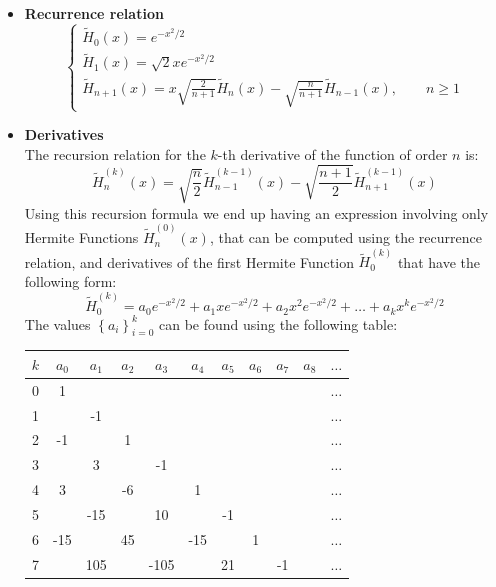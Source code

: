 \documentclass[a4paper,10pt]{article}
\begin{document}
\begin{itemize}
\item \textbf{Recurrence relation}
	\begin{equation}
		\begin{cases}
		\tilde{H}_0(x) = e^{-x^2/2}\\
		\tilde{H}_1(x) = \sqrt{2} x e^{-x^2/2}\\
		\tilde{H}_{n+1}(x) = x \sqrt{\frac{2}{n+1}} \tilde{H}_n(x) - \sqrt{\frac{n}{n+1}} \tilde{H}_{n-1}(x), \qquad n \geq 1
		\end{cases}
	\end{equation}
\item \textbf{Derivatives}\\
	The recursion relation for the $k$-th derivative of the function of order $n$ is:
	\begin{equation}
		\tilde{H}_n^{(k)}(x) = \sqrt{\frac{n}{2}}\tilde{H}_{n-1}^{(k-1)}(x) - \sqrt{\frac{n+1}{2}}\tilde{H}_{n+1}^{(k-1)}(x)
	\end{equation}
	Using this recursion formula we end up having an expression involving only Hermite Functions $ \tilde{H}_n^{(0)}(x) $, that can be computed using the recurrence relation, and derivatives of the first Hermite Function $ \tilde{H}_0^{(k)} $ that have the following form:
	\begin{equation}
		\tilde{H}_0^{(k)} = a_0 e^{-x^2/2} + a_1 x e^{-x^2/2} + a_2 x^2 e^{-x^2/2} + \ldots + a_k x^k e^{-x^2/2} 
	\end{equation}
	The values $ \left\lbrace a_i \right\rbrace_{i=0}^k $ can be found using the following table:
	\begin{center}
	\begin{tabular}{c|c|c|c|c|c|c|c|c|c|c}
		$k$ & $a_0$ & $a_1$ & $a_2$ & $a_3$ & $a_4$ & $a_5$ & $a_6$ & $a_7$ & $a_8$ & $\ldots$ \\ \hline
		0 & 1 & & & & & & & & & $\ldots$ \\ \hline
		1 & & -1 & & & & & & & & $\ldots$ \\ \hline
		2 & -1 & & 1 & & & & & & & $\ldots$ \\ \hline
		3 & & 3 & & -1 & & & & & & $\ldots$ \\ \hline
		4 & 3 & & -6 & & 1 & & & & & $\ldots$ \\ \hline
		5 & & -15 & & 10 & & -1 & & & & $\ldots$ \\ \hline
		6 & -15 & & 45 & & -15 & & 1 & & & $\ldots$ \\ \hline
		7 & & 105 & & -105 & & 21 & & -1 & & $\ldots$ \\ \hline

\end{tabular}
\end{center}
\end{itemize}
\end{document}

